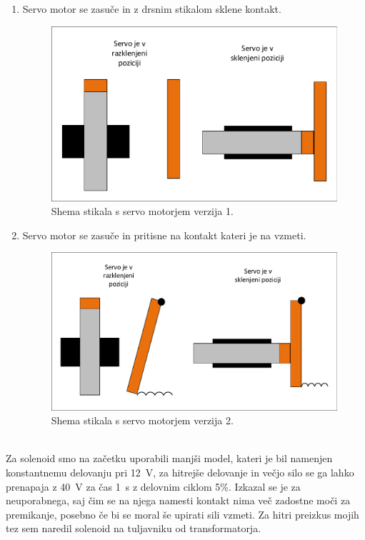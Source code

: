 \documentclass[a4paper,twoside,openright,12pt,Slovene]{book}
\begin{document}
\begin{enumerate}
    \item  Servo motor se zasuče in z drsnim stikalom sklene kontakt.
    \begin{figure}[H]
        \centering
        \includegraphics[width=1\columnwidth]{Sheme/StikaloServoVerzija1.pdf}
        \caption{\label{StikaloServoVerzija1} Shema stikala s servo motorjem verzija 1.}
    \end{figure}
    
    \item  Servo motor se zasuče in pritisne na kontakt kateri je na vzmeti.
    \begin{figure}[H]
        \centering
        \includegraphics[width=1\columnwidth]{Sheme/StikaloServoVerzija2.pdf}
        \caption{\label{StikaloServoVerzija2} Shema stikala s servo motorjem verzija 2.}
    \end{figure}
\end{enumerate}


    ~\\Za solenoid smo na začetku uporabili manjši model, kateri je bil namenjen konstantnemu delovanju pri \SI{12}{\volt}, za hitrejše delovanje in večjo silo se ga lahko prenapaja z  \SI{40}{\volt} za čas  \SI{1}{\second} z delovnim ciklom 5\%. Izkazal se je za neuporabnega, saj čim se na njega namesti kontakt nima več zadostne moči za premikanje, posebno če bi se moral še upirati sili vzmeti. Za hitri preizkus mojih tez sem naredil solenoid na tuljavniku od transformatorja.
    
\end{document}

